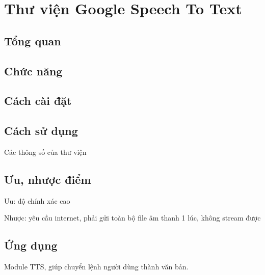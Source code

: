 \section{Thư viện Google Speech To Text}

\subsection{Tổng quan}

\subsection{Chức năng}

\subsection{Cách cài đặt}

\subsection{Cách sử dụng}

Các thông số của thư viện

\subsection{Ưu, nhược điểm}

Ưu: độ chính xác cao

Nhược: yêu cầu internet, phải gửi toàn bộ file âm thanh 1 lúc, không stream được

\subsection{Ứng dụng}

Module TTS, giúp chuyển lệnh người dùng thành văn bản.
